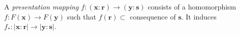 A \textit{presentation mapping} $f: (\mathbf{x} : \mathbf{r}) \to (\mathbf{y} : \mathbf{s})$ consists of a homomorphism $f: F(\mathbf{x}) \to F(\mathbf{y})$ such that $f(\mathbf{r}) \subset $ consequence of $\mathbf{s}$. It induces $f_*: |\mathbf{x} : \mathbf{r}| \to |\mathbf{y} : \mathbf{s}|$.
